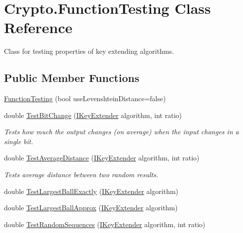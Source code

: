 \hypertarget{class_crypto_1_1_function_testing}{}\section{Crypto.\+Function\+Testing Class Reference}
\label{class_crypto_1_1_function_testing}


Class for testing properties of key extending algorithms.  


\subsection*{Public Member Functions}
\begin{DoxyCompactItemize}
\item 
\hyperlink{class_crypto_1_1_function_testing_aa62a4223204dece41f9cc6fac9882834}{Function\+Testing} (bool use\+Levenshtein\+Distance=false)
\item 
double \hyperlink{class_crypto_1_1_function_testing_a4b3e7a81134c8e7337cf1b682f0be528}{Test\+Bit\+Change} (\hyperlink{interface_crypto_1_1_i_key_extender}{I\+Key\+Extender} algorithm, int ratio)
\begin{DoxyCompactList}\small\item\em Tests how much the output changes (on average) when the input changes in a single bit. \end{DoxyCompactList}\item 
double \hyperlink{class_crypto_1_1_function_testing_a847341d3b4a2f0e8ff155bc55ab3484f}{Test\+Average\+Distance} (\hyperlink{interface_crypto_1_1_i_key_extender}{I\+Key\+Extender} algorithm, int ratio)
\begin{DoxyCompactList}\small\item\em Tests average distance between two random results. \end{DoxyCompactList}\item 
double \hyperlink{class_crypto_1_1_function_testing_a11e504dfb7c6771eeb863f86a47a256d}{Test\+Largest\+Ball\+Exactly} (\hyperlink{interface_crypto_1_1_i_key_extender}{I\+Key\+Extender} algorithm)
\item 
double \hyperlink{class_crypto_1_1_function_testing_a937d2b136d13f2bc57ca3c03778c763e}{Test\+Largest\+Ball\+Approx} (\hyperlink{interface_crypto_1_1_i_key_extender}{I\+Key\+Extender} algorithm)
\item 
double \hyperlink{class_crypto_1_1_function_testing_acf3f02d42487bc168ce29e431ced28f6}{Test\+Random\+Sequences} (\hyperlink{interface_crypto_1_1_i_key_extender}{I\+Key\+Extender} algorithm, int ratio)

\end{DoxyCompactItemize}
